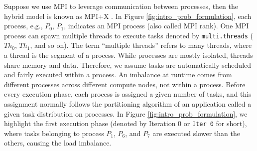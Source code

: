 Suppose we use MPI to leverage communication between processes, then the hybrid model is known as MPI+X \cite{rabenseifner2006mpiomp}. In Figure \ref{fig:intro_prob_formulation}, each process, e.g., $P_{0}$, $P_{1}$, indicates an MPI process (also called MPI rank). One MPI process can spawn multiple threads to execute tasks denoted by \texttt{multi.threads} ($Th_{0}$, $Th_{1}$, and so on). The term ``multiple threads'' refers to many threads, where a thread is the segment of a process. While processes are mostly isolated, threads share memory and data. Therefore, we assume tasks are automatically scheduled and fairly executed within a process. An imbalance at runtime comes from different processes across different compute nodes, not within a process. Before every execution phase, each process is assigned a given number of tasks, and this assignment normally follows the partitioning algorithm of an application called a given task distribution on processes. In Figure \ref{fig:intro_prob_formulation}, we highlight the first execution phase (denoted by Iteration 0 or \texttt{Iter 0} for short), where tasks belonging to process $P_{1}$, $P_{6}$, and $P_{7}$ are executed slower than the others, causing the load imbalance.\\

